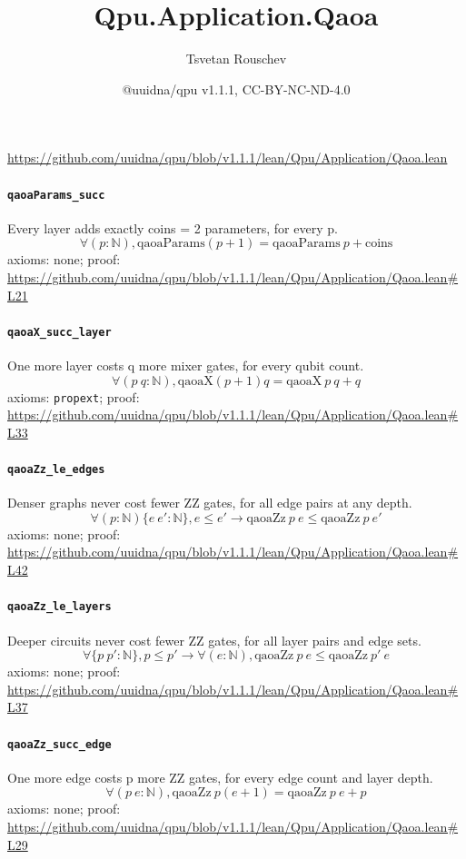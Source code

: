 \documentclass[11pt]{article}
\title{Qpu.Application.Qaoa}
\author{Tsvetan Rouschev}
\date{@uuidna/qpu v1.1.1, CC-BY-NC-ND-4.0}
\begin{document}
\maketitle
\noindent\url{https://github.com/uuidna/qpu/blob/v1.1.1/lean/Qpu/Application/Qaoa.lean}

\paragraph{\texttt{qaoaParams\_succ}}
Every layer adds exactly coins = 2 parameters, for every p.
\[ \forall (p : \mathbb{N}), \mathrm{qaoaParams} (p + 1) = \mathrm{qaoaParams}\ p + \mathrm{coins} \]
\noindent axioms: none; proof: \url{https://github.com/uuidna/qpu/blob/v1.1.1/lean/Qpu/Application/Qaoa.lean\#L21}

\paragraph{\texttt{qaoaX\_succ\_layer}}
One more layer costs q more mixer gates, for every qubit count.
\[ \forall (p\ q : \mathbb{N}), \mathrm{qaoaX} (p + 1) q = \mathrm{qaoaX}\ p\ q + q \]
\noindent axioms: \texttt{propext}; proof: \url{https://github.com/uuidna/qpu/blob/v1.1.1/lean/Qpu/Application/Qaoa.lean\#L33}

\paragraph{\texttt{qaoaZz\_le\_edges}}
Denser graphs never cost fewer ZZ gates, for all edge pairs at any depth.
\[ \forall (p : \mathbb{N}) \{e\ e' : \mathbb{N}\}, e \le e' \to \mathrm{qaoaZz}\ p\ e \le \mathrm{qaoaZz}\ p\ e' \]
\noindent axioms: none; proof: \url{https://github.com/uuidna/qpu/blob/v1.1.1/lean/Qpu/Application/Qaoa.lean\#L42}

\paragraph{\texttt{qaoaZz\_le\_layers}}
Deeper circuits never cost fewer ZZ gates, for all layer pairs and edge sets.
\[ \forall \{p\ p' : \mathbb{N}\}, p \le p' \to \forall (e : \mathbb{N}), \mathrm{qaoaZz}\ p\ e \le \mathrm{qaoaZz}\ p'\ e \]
\noindent axioms: none; proof: \url{https://github.com/uuidna/qpu/blob/v1.1.1/lean/Qpu/Application/Qaoa.lean\#L37}

\paragraph{\texttt{qaoaZz\_succ\_edge}}
One more edge costs p more ZZ gates, for every edge count and layer depth.
\[ \forall (p\ e : \mathbb{N}), \mathrm{qaoaZz}\ p (e + 1) = \mathrm{qaoaZz}\ p\ e + p \]
\noindent axioms: none; proof: \url{https://github.com/uuidna/qpu/blob/v1.1.1/lean/Qpu/Application/Qaoa.lean\#L29}
\end{document}
